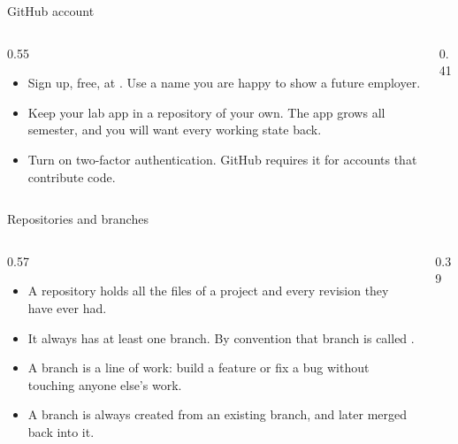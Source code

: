 \documentclass[10pt,aspectratio=169,t]{beamer}
\begin{document}
\begin{frame}[eyebrow=Git]{GitHub account}
  \vskip 2mm
  \begin{columns}[T]
    \begin{column}{0.55\textwidth}
      \begin{itemize}
        \item Sign up, free, at . Use a name you are happy to show a future employer.
        \item Keep your lab app in a repository of your own. The app grows all semester, and you will want every working state back.
        \item Turn on two-factor authentication. GitHub requires it for accounts that contribute code.
      \end{itemize}
    \end{column}
    \begin{column}{0.41\textwidth}
      \vskip 3mm
    \end{column}
  \end{columns}
\end{frame}

\begin{frame}[eyebrow=Git]{Repositories and branches}
  \vskip 2mm
  \begin{columns}[T]
    \begin{column}{0.57\textwidth}
      \begin{itemize}
        \item A repository holds all the files of a project and every revision they have ever had.
        \item It always has at least one branch. By convention that branch is called .
        \item A branch is a line of work: build a feature or fix a bug without touching anyone else's work.
        \item A branch is always created from an existing branch, and later merged back into it.
      \end{itemize}
    \end{column}
    \begin{column}{0.39\textwidth}
      \vskip 3mm
    \end{column}
  \end{columns}
\end{frame}
\end{document}
